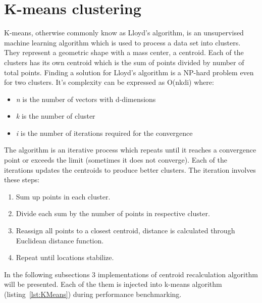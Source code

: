 \clearpage
\section{K-means clustering}
\label{sec: KMeansImp}
K-means, otherwise commonly know as Lloyd's algorithm, is an unsupervised machine learning algorithm which is used to process a data set into clusters.
They represent a geometric shape with a mass center, a centroid.
Each of the clusters has its own centroid which is the sum of points divided by number of total points. Finding a solution for Lloyd's algorithm is a NP-hard problem even for two clusters. It's complexity can be expressed as O(nkdi) where:
\begin{itemize}
	\item \emph{n} is the number of vectors with d-dimensions
	\item \emph{k} is the number of cluster
	\item \emph{i} is the number of iterations required for the convergence
\end{itemize}

The algorithm is an iterative process which repeats until it reaches a convergence point or exceeds the limit (sometimes it does not converge).
Each of the iterations updates the centroids to produce better clusters.
The iteration involves these steps:
\begin{enumerate}
	\item Sum up points in each cluster.
	\item Divide each sum by the number of points in respective cluster.
	\item Reassign all points to a closest centroid, distance is calculated through Euclidean distance function.
	\item Repeat until locations stabilize.
\end{enumerate}

In the following subsections 3 implementations of centroid recalculation algorithm will be presented. Each of the them is injected into k-means algorithm (listing~\ref{lst:KMeans}) during performance benchmarking.

